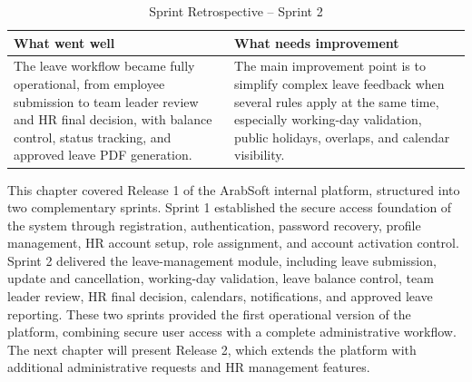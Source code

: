
\begin{table}[H]
\centering
\renewcommand{\arraystretch}{1.7}
\setlength{\tabcolsep}{8pt}
\begin{tabular}{|>{\RaggedRight\arraybackslash}m{6.2cm}|>{\RaggedRight\arraybackslash}m{6.2cm}|}
\hline
\rowcolor{blue!20}
\centering\textbf{What went well} & \centering\textbf{What needs improvement} \tabularnewline
\hline
The leave workflow became fully operational, from employee submission to team leader review and HR final decision, with balance control, status tracking, and approved leave PDF generation.
&
The main improvement point is to simplify complex leave feedback when several rules apply at the same time, especially working-day validation, public holidays, overlaps, and calendar visibility.
\\
\hline
\end{tabular}
\caption{Sprint Retrospective -- Sprint 2}
\label{tab:sprint2_retrospective}
\end{table}





{\fontsize{12}{18}\selectfont
\setlength{\parindent}{1.2cm}
\setlength{\parskip}{6pt}

\indent This chapter covered Release 1 of the ArabSoft internal platform, structured into two complementary sprints. Sprint 1 established the secure access foundation of the system through registration, authentication, password recovery, profile management, HR account setup, role assignment, and account activation control. Sprint 2 delivered the leave-management module, including leave submission, update and cancellation, working-day validation, leave balance control, team leader review, HR final decision, calendars, notifications, and approved leave reporting. These two sprints provided the first operational version of the platform, combining secure user access with a complete administrative workflow. The next chapter will present Release 2, which extends the platform with additional administrative requests and HR management features.

}
